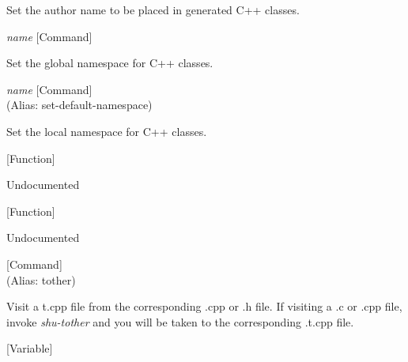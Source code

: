 \begin{doc-string}
Set the author name to be placed in generated C++ classes.
\end{doc-string}

\vspace{1em}
\noindent
{}
\usebox{\funcname}\emph{name}
 \hfill [Command]

\begin{doc-string}
Set the global namespace for C++ classes.
\end{doc-string}

\vspace{1em}
\noindent
{}
\usebox{\funcname}\emph{name}
 \hfill [Command]\\%
 (Alias: set-default-namespace)

\begin{doc-string}
Set the local namespace for C++ classes.
\end{doc-string}

\vspace{1em}
\noindent
{}
\usebox{\funcname}
 \hfill [Function]

\begin{doc-string}
Undocumented
\end{doc-string}

\vspace{1em}
\noindent
{}
\usebox{\funcname}
 \hfill [Function]

\begin{doc-string}
Undocumented
\end{doc-string}

\vspace{1em}
\noindent
{}
\usebox{\funcname}
 \hfill [Command]\\%
 (Alias: tother)

\begin{doc-string}
Visit a t.cpp file from the corresponding .cpp or .h file.  If visiting a .c or
.cpp file, invoke \emph{shu-tother} and you will be taken to the corresponding .t.cpp
file.
\end{doc-string}

\vspace{1em}
\noindent
{}
\usebox{\funcname}
 \hfill [Variable]

